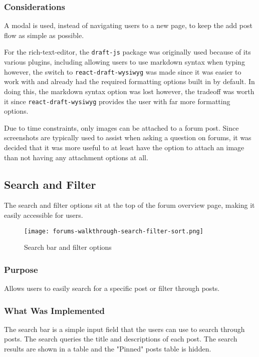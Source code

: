 \subsubsection{Considerations}
A modal is used, instead of navigating users to a new page, to keep the add post flow as simple as possible.

For the rich-text-editor, the \texttt{draft-js} package was originally used because of its various plugins, including allowing users to use markdown syntax when typing
however, the switch to \texttt{react-draft-wysiwyg} was made since it was easier to work with and already had the required formatting options built in by default.
In doing this, the markdown syntax option was lost however, the tradeoff was worth it since \texttt{react-draft-wysiwyg} provides the user with far more formatting options.

Due to time constraints, only images can be attached to a forum post.
Since screenshots are typically used to assist when asking a question on forums, it was decided that it was more useful to at least have the option to attach an image than not having any attachment options at all.

\subsection{Search and Filter}
The search and filter options sit at the top of the forum overview page, making it easily accessible for users.


\begin{figure}[h!]
    \texttt{[image: forums-walkthrough-search-filter-sort.png]}
    \centering
    \caption{Search bar and filter options}
\end{figure}

\subsubsection{Purpose}
Allows users to easily search for a specific post or filter through posts.

\subsubsection{What Was Implemented}
The search bar is a simple input field that the users can use to search through posts.
The search queries the title and descriptions of each post.
The search results are shown in a table and the "Pinned" posts table is hidden.


